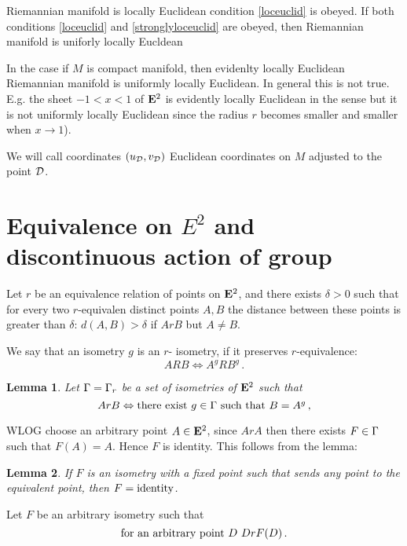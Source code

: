 \documentclass[12pt]{article}
\theoremstyle{theorem}
\theoremstyle{lemma}
\newtheorem{lm}{Lemma}
\numberwithin{equation}{section}
\begin{document}
Riemannian manifold
is locally Euclidean condition \eqref{loceuclid}
is obeyed. If both conditions \eqref{loceuclid}
and \eqref{stronglyloceuclid} are obeyed, then
Riemannian manifold is {uniforly locally Eucldean}

In the case if $M$ is compact manifold,
then evidenlty locally Euclidean Riemannian manifold is  uniformly locally Euclidean.
In general this is not true.
E.g. the sheet
   $-1<x<1$ of ${\bf E}^2$ is evidently locally Euclidean in the sense
but it is not uniformly locally Euclidean
since the radius $r$
becomes smaller and smaller when $x\to 1$).

We will call coordinates $(u_{\cal D},v_{\cal D})$
Euclidean coordinates on $M$ adjusted to the point ${\cal D}$.



\section {Equivalence on $E^2$ and discontinuous action of group}

   Let $r$ be an equivalence relation of points on ${\bf E}^2$,
and  there exists $\delta>0$ such that
for every two $r$-equivalen distinct  points $A,B$ 
 the distance between these points
is greater than $\delta$: $d(A,B)>\delta$ if $ArB$
but $A\not=B$.

   We say that  an isometry $g$ is an $r$- isometry,
if it preserves $r$-equivalence:
              $$
    ARB\Leftrightarrow  A^gRB^g\,.
              $$
\begin{lm}
Let  ${\Gamma}={\Gamma}_r$ be a set of isometries of ${\bf E}^2$
such that
       \begin{equation*}
      ArB \Leftrightarrow \hbox{there exist $g\in {\Gamma}$
such that $B=A^g$}\,,
\end{equation*}

\end{lm}


  WLOG  choose an arbitrary point $A\in {\bf E}^2$,
since $ArA$ then there exists $F\in {\Gamma}$ such that
$F(A)=A$. Hence $F$ is identity.  This follows from the lemma:


  \begin{lm}
If $F$ is an isometry with a fixed point
such that
sends any point to the equivalent point,
then  $F={\rm identity}$.
 \end{lm}

 Let $F$ be an arbitrary isometry such that
       \begin{equation*}
\hbox{for an arbitrary point $D$}\,\,
      DrF(D)\,.
\end{equation*}
\end{document}
